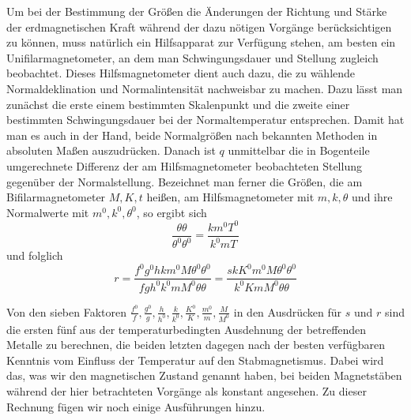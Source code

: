 Um bei der Bestimmung der Größen die Änderungen der Richtung und Stärke der erdmagnetischen Kraft während der dazu nötigen Vorgänge berücksichtigen zu können, muss natürlich ein Hilfsapparat zur Verfügung stehen, am besten ein Unifilarmagnetometer, an dem man Schwingungsdauer und Stellung zugleich beobachtet. Dieses Hilfsmagnetometer dient auch dazu, die zu wählende Normaldeklination und Normalintensität nachweisbar zu machen. Dazu lässt man zunächst die erste einem bestimmten Skalenpunkt und die zweite einer bestimmten Schwingungsdauer bei der Normaltemperatur entsprechen. Damit hat man es auch in der Hand, beide Normalgrößen nach bekannten Methoden in absoluten Maßen auszudrücken. Danach ist $q$ unmittelbar die in Bogenteile umgerechnete Differenz der am Hilfsmagnetometer beobachteten Stellung gegenüber der Normalstellung. Bezeichnet man ferner die Größen, die am Bifilarmagnetometer $M,K,t$ heißen, am Hilfsmagnetometer mit $m,k,\theta$ und ihre Normalwerte mit $m^0,k^0,\theta^0$, so ergibt sich
\[
\frac{\theta\theta}{\theta^0\theta^0}=\frac{km^0T^0}{k^0mT}
\]
und folglich
\[
r=\frac{f^0g^0hkm^0M\theta^0\theta^0}{fgh^0k^0mM^0\theta\theta}=\frac{skK^0m^0M\theta^0\theta^0}{k^0KmM^0\theta\theta}
\]

Von den sieben Faktoren $\frac{f^0}{f},\frac{g^0}{g},\frac{h}{h^0},\frac{k}{k^0},\frac{K^0}{K},\frac{m^0}{m},\frac{M}{M^0}$ in den Ausdrücken für $s$ und $r$ sind die ersten fünf aus der temperaturbedingten Ausdehnung der betreffenden Metalle zu berechnen, die beiden letzten dagegen nach der besten verfügbaren Kenntnis vom Einfluss der Temperatur auf den Stabmagnetismus. Dabei wird das, was wir den magnetischen Zustand genannt haben, bei beiden Magnetstäben während der hier betrachteten Vorgänge als konstant angesehen. Zu dieser Rechnung fügen wir noch einige Ausführungen hinzu.

